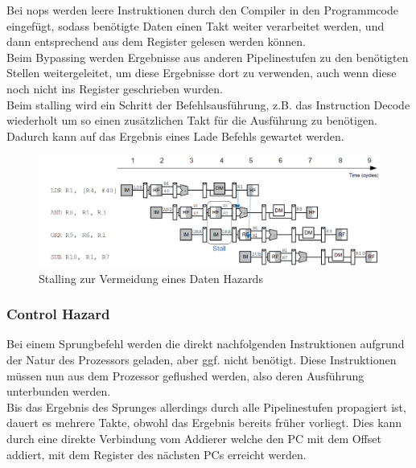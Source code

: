 \documentclass[a4paper,12pt,leqno]{article}
\begin{document}
Bei nops werden leere Instruktionen durch den Compiler in den Programmcode eingefügt, sodass benötigte Daten einen Takt weiter verarbeitet werden, und dann entsprechend aus dem Register gelesen werden können.\\

Beim Bypassing werden Ergebnisse aus anderen Pipelinestufen zu den benötigten Stellen weitergeleitet, um diese Ergebnisse dort zu verwenden, auch wenn diese noch nicht ins Register geschrieben wurden.\\

Beim stalling wird ein Schritt der Befehlsausführung, z.B. das Instruction Decode wiederholt um so einen zusätzlichen Takt für die Ausführung zu benötigen. Dadurch kann auf das Ergebnis eines Lade Befehls gewartet werden.

\begin{figure}[h!]
\centering
\includegraphics[scale=0.55]{Grafiken/Stalling.png}
\caption{Stalling zur Vermeidung eines Daten Hazards}
\end{figure}

\subsubsection{Control Hazard}

Bei einem Sprungbefehl werden die direkt nachfolgenden Instruktionen aufgrund der Natur des Prozessors geladen, aber ggf. nicht benötigt. Diese Instruktionen müssen nun aus dem Prozessor geflushed werden, also deren Ausführung unterbunden werden.\\
Bis das Ergebnis des Sprunges allerdings durch alle Pipelinestufen propagiert ist, dauert es mehrere Takte, obwohl das Ergebnis bereits früher vorliegt. Dies kann durch eine direkte Verbindung vom Addierer welche den PC mit dem Offset addiert, mit dem Register des nächsten PCs erreicht werden.\\
\end{document}
